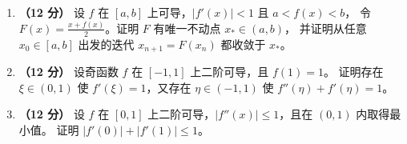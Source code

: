 \documentclass[UTF8,a4paper,zihao=-4,fontset=fandol]{ctexart}
\begin{document}
\begin{enumerate}[start=20]
\item \textbf{（12 分）} 设 $f$ 在 $[a,b]$ 上可导，$|f'(x)|<1$ 且 $a<f(x)<b$，
令 $F(x)=\frac{x+f(x)}{2}$。证明 $F$ 有唯一不动点 $x_*\in(a,b)$，
并证明从任意 $x_0\in[a,b]$ 出发的迭代 $x_{n+1}=F(x_n)$ 都收敛于 $x_*$。
\vspace{5.5cm}
\item \textbf{（12 分）} 设奇函数 $f$ 在 $[-1,1]$ 上二阶可导，且 $f(1)=1$。
证明存在 $\xi\in(0,1)$ 使 $f'(\xi)=1$，又存在 $\eta\in(-1,1)$ 使 $f''(\eta)+f'(\eta)=1$。
\vspace{5.5cm}
\item \textbf{（12 分）} 设 $f$ 在 $[0,1]$ 上二阶可导，$|f''(x)|\le1$，且在 $(0,1)$ 内取得最小值。
证明 $|f'(0)|+|f'(1)|\le1$。
\end{enumerate}
\end{document}
